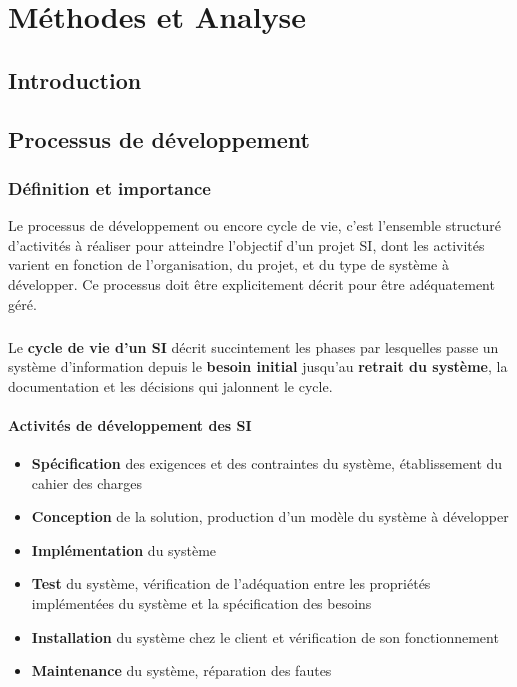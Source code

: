 \chapter{Méthodes et Analyse}

\section*{Introduction}%
%
\blindtext
\section{Processus de développement }
\subsection{Définition et importance}
Le processus de développement ou encore cycle de vie, c'est l'ensemble structuré d'activités à réaliser pour atteindre l'objectif d'un projet SI, dont les activités varient en fonction de l'organisation, du projet, et du type de système à développer. Ce processus doit être explicitement décrit pour être adéquatement géré. 
\paragraph{}
Le \textbf{cycle de vie d'un SI} décrit succintement les phases par lesquelles passe un système d'information depuis le \textbf{besoin initial} jusqu'au \textbf{retrait du système}, la documentation et les décisions qui jalonnent le cycle.

\subsubsection{Activités de développement des SI}
\begin{itemize}
    \item \textbf{Spécification} des exigences et des contraintes du système, établissement du cahier des charges
    \item \textbf{Conception} de la solution, production d'un modèle du système à développer
    \item \textbf{Implémentation} du système
    \item \textbf{Test} du système, vérification de l'adéquation entre les propriétés implémentées du système et la spécification des besoins
    \item \textbf{Installation} du système chez le client et vérification de son fonctionnement
    \item \textbf{Maintenance} du système, réparation des fautes
\end{itemize}

